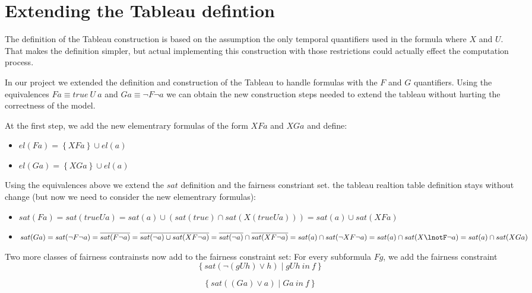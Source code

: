 \documentclass[11pt]{article}
\begin{document}
\section{Extending the Tableau defintion}
    The definition of the Tableau construction is based on the assumption the only temporal quantifiers
    used in the formula where $X$ and $U$. That makes the definition simpler, but actual implementing this
    construction with those restrictions could actually effect the computation process.

    In our project we extended the definition and construction of the Tableau to handle formulas with the
    $F$ and $G$ quantifiers. Using the equivalences $Fa \equiv true\ U\ a$ and $Ga \equiv \lnot F \lnot a$
    we can obtain the new construction steps needed to extend the tableau without hurting the correctness
    of the model.

    At the first step, we add the new elementrary formulas of the form $XFa$ and $XGa$ and define:

    \begin{itemize}
        \item $el(Fa) = \left\{XFa\right\} \cup el(a)$
        \item $el(Ga) = \left\{XGa\right\} \cup el(a)$
    \end{itemize}

    Using the equivalences above we extend the $sat$ definition and the fairness constriant set. the tableau realtion table definition
    stays without change (but now we need to consider the new elementrary formulas):

    \begin{itemize}
        \item $sat(F a) = sat(true U a) = sat(a) \cup (sat(true) \cap sat(X(true U a))) = sat(a) \cup sat(XFa)$
        \item $sat(G a) = sat(\lnot F \lnot a) = \overline{sat(F \lnot a)} = \overline{sat(\lnot a) \cup sat(XF\lnot a)} =
        \overline{sat(\lnot a)} \cap \overline{sat(XF\lnot a)} = sat(a) \cap sat(\lnot XF\lnot a) = sat(a) \cap sat(X\lnotF\lnot a) = sat(a) \cap sat(XGa)$
    \end{itemize}

    Two more classes of fairness contrainsts now add to the fairness constraint set:
    For every subformula $Fg$, we add the fairness constraint
    \[
        \left\{sat(\neg(gUh)\vee h) \;|\; gUh\ in\ f \right\}
    \]

    \[
        \left\{sat((Ga)\vee a) \;|\; Ga\ in\ f \right\}
    \]
\end{document}
